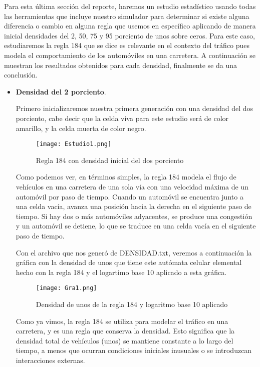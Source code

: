 \documentclass{article}
\begin{document}
	Para esta última sección del reporte, haremos un estudio estadístico usando todas las herramientas que incluye nuestro simulador para determinar si existe alguna diferencia o cambio en alguna regla que usemos en específico aplicando de manera inicial densidades del 2, 50, 75 y 95 porciento de unos sobre ceros. Para este caso, estudiaremos la regla 184 que se dice es relevante en el contexto del tráfico pues modela el comportamiento de los automóviles en una carretera. A continuación se muestran los resultados obtenidos para cada densidad, finalmente se da una conclusión.
	
	\begin{itemize}
		
		\item \textbf{Densidad del 2 porciento}.
		
		Primero inicializaremos nuestra primera generación con una densidad del dos porciento, cabe decir que la celda viva para este estudio será de color amarillo, y la celda muerta de color negro.
		\vspace{300pt}
		\begin{figure}[h]
			\centering       
			\texttt{[image: Estudio1.png]}
			\caption{Regla 184 con densidad inicial del dos porciento}
			\label{fig:mi_imagen1}
		\end{figure}
		
		Como podemos ver, en términos simples, la regla 184 modela el flujo de vehículos en una carretera de una sola vía con una velocidad máxima de un automóvil por paso de tiempo. Cuando un automóvil se encuentra junto a una celda vacía, avanza una posición hacia la derecha en el siguiente paso de tiempo. Si hay dos o más automóviles adyacentes, se produce una congestión y un automóvil se detiene, lo que se traduce en una celda vacía en el siguiente paso de tiempo.
		
		Con el archivo que nos generó de DENSIDAD.txt, veremos a continuación la gráfica con la densidad de unos que tiene este autómata celular elemental hecho con la regla 184 y el logartimo base 10 aplicado a esta gráfica. 
			\begin{figure}[h]
			\centering       
			\texttt{[image: Gra1.png]}
			\caption{Densidad de unos de la regla 184 y logaritmo base 10 aplicado}
			\label{fig:mi_imagen1}
		\end{figure}
		
		
		Como ya vimos, la regla 184 se utiliza para modelar el tráfico en una carretera, y es una regla que conserva la densidad. Esto significa que la densidad total de vehículos (unos) se mantiene constante a lo largo del tiempo, a menos que ocurran condiciones iniciales inusuales o se introduzcan interacciones externas. 
		

\end{itemize}
\end{document}
